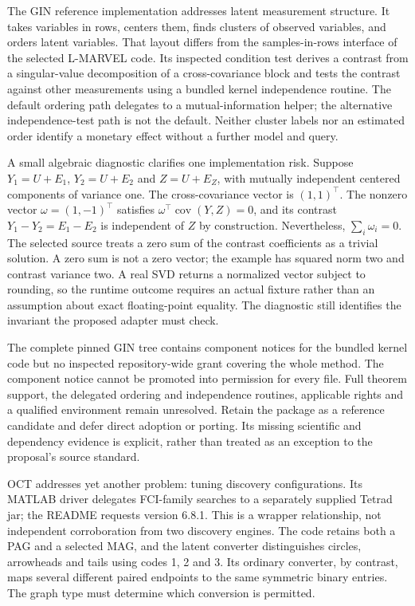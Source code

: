 The GIN reference implementation addresses latent measurement structure.
It takes variables in rows, centers them, finds clusters of observed
variables, and orders latent variables. That layout differs from the
samples-in-rows interface of the selected L-MARVEL code. Its inspected
condition test derives a contrast from a singular-value decomposition of
a cross-covariance block and tests the contrast against other
measurements using a bundled kernel independence routine. The default
ordering path delegates to a mutual-information helper; the alternative
independence-test path is not the default. Neither cluster labels nor an
estimated order identify a monetary effect without a further model and
query. \citep{exec14_olatent_gin}

A small algebraic diagnostic clarifies one implementation risk. Suppose
\(Y_1=U+E_1\), \(Y_2=U+E_2\) and \(Z=U+E_Z\), with mutually independent
centered components of variance one. The cross-covariance vector is
\((1,1)^\top\). The nonzero vector \(\omega=(1,-1)^\top\) satisfies
\(\omega^\top\operatorname{cov}(Y,Z)=0\), and its contrast
\(Y_1-Y_2=E_1-E_2\) is independent of \(Z\) by construction.
Nevertheless, \(\sum_i\omega_i=0\). The selected source treats a zero
sum of the contrast coefficients as a trivial solution. A zero sum is
not a zero vector; the example has squared norm two and contrast
variance two. A real SVD returns a normalized vector subject to
rounding, so the runtime outcome requires an actual fixture rather than
an assumption about exact floating-point equality. The diagnostic still
identifies the invariant the proposed adapter must check.
\citep{exec14_olatent_gin,exec14_olatent_oracle}

The complete pinned GIN tree contains component notices for the bundled
kernel code but no inspected repository-wide grant covering the whole
method. The component notice cannot be promoted into permission for
every file. Full theorem support, the delegated ordering and
independence routines, applicable rights and a qualified environment
remain unresolved. Retain the package as a reference candidate and defer
direct adoption or porting. Its missing scientific and dependency
evidence is explicit, rather than treated as an exception to the
proposal's source standard. \citep{exec14_olatent_gin}

OCT addresses yet another problem: tuning discovery configurations. Its
MATLAB driver delegates FCI-family searches to a separately supplied
Tetrad jar; the README requests version 6.8.1. This is a wrapper
relationship, not independent corroboration from two discovery engines.
The code retains both a PAG and a selected MAG, and the latent converter
distinguishes circles, arrowheads and tails using codes 1, 2 and 3. Its
ordinary converter, by contrast, maps several different paired endpoints
to the same symmetric binary entries. The graph type must determine
which conversion is permitted. \citep{exec14_olatent_oct}

